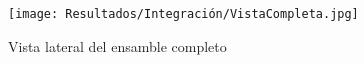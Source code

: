 		\begin{figure}[H]
			\centering
			\texttt{[image: Resultados/Integración/VistaCompleta.jpg]}
			\caption{Vista lateral del ensamble completo}
			\label{fig:VistaCompleta}
		\end{figure}

			
			
			